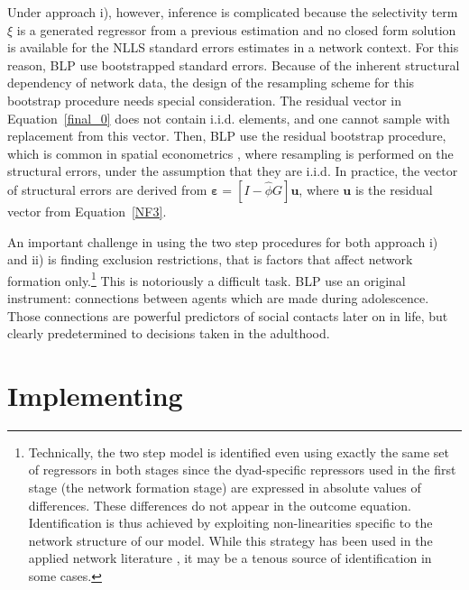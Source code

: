 \documentclass[nojss]{jss}
\begin{document}
Under approach i), however, inference is complicated because the selectivity
term $\xi$ is a generated regressor from a previous estimation and no closed
form solution is available for the NLLS standard errors estimates in a
network context.  For this reason, BLP use bootstrapped standard errors. 
Because of the inherent structural dependency of network data, the design of
the resampling scheme for this bootstrap procedure needs special
consideration.  The residual vector in Equation~\ref{final_0} does not
contain i.i.d.  elements, and one cannot sample with replacement from this
vector.  Then, BLP use the residual bootstrap procedure, which is common in
spatial econometrics \citep[see][]{Anselin:1990}, where resampling is
performed on the structural errors, under the assumption that they are
i.i.d.  In practice, the vector of structural errors are derived from
$\mathbf{\varepsilon}=[I-\widehat{\phi}G]\boldsymbol{u}$, where
$\boldsymbol{u}$ is the residual vector from Equation~\ref{NF3}.

An important challenge in using the two step procedures for both approach i)
and ii) is finding exclusion restrictions, that is factors that affect
network formation only.\footnote{Technically, the two step model is
identified even using exactly the same set of regressors in both stages
since the dyad-specific repressors used in the first stage (the network
formation stage) are expressed in absolute values of differences.  These
differences do not appear in the outcome equation.  Identification is thus
achieved by exploiting non-linearities specific to the network structure of
our model.  While this strategy has been used in the applied network
literature \citep[see e.g.,][]{GPI:2013,CSL:2016}, it may be a tenous source
of identification in some cases.} This is notoriously a difficult task.  BLP
use an original instrument: connections between agents which are made during
adolescence.  Those connections are powerful predictors of social contacts
later on in life, but clearly predetermined to decisions taken in the
adulthood.

\section[Implementing econet]{Implementing }\label{sec:econet}
\end{document}
